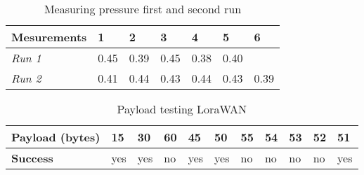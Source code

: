 \begin{table}[h!]
	\centering
	\begin{tabular}{@{}lllllll@{}}
		\toprule
		\textbf{Mesurements} & \textbf{1} & \textbf{2} & \textbf{3} & \textbf{4} & \textbf{5} & \textbf{6} \\ \midrule
		\textit{Run 1} & 0.45 & 0.39 & 0.45 & 0.38 & 0.40 &  \\
		\textit{Run 2} & 0.41 & 0.44 & 0.43 & 0.44 & 0.43 & 0.39 \\ \bottomrule
	\end{tabular}
	\caption[Measuring pressure first and second run]{Measuring pressure first and second run}
	\label{tab:PressureData}
\end{table}

\begin{table}[h!]
	\centering
	\begin{tabular}{@{}lllllllllll@{}}
		\toprule
		\textbf{Payload (bytes)} & 15  & 30  & 60 & 45  & 50  & 55 & 54 & 53 & 52 & 51  \\ \midrule
		\textbf{Success} & yes & yes & no & yes & yes & no & no & no & no & yes \\ \bottomrule
	\end{tabular}
	\caption[Payload testing LoraWAN]{Payload testing LoraWAN}
	\label{tab:LoraWanPayload}
\end{table}







